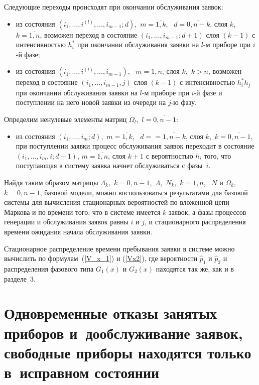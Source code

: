 \begin{multicols}{2}
Следующие переходы происходят при окончании обслуживания заявок:
\begin{itemize}
\item
из состояния
$(i_1,\ldots,i^{(l)},\ldots,i_{m-1};d)$,\
$m=\overline{1,k}$, \  $d=\overline{0,n-k}$,
слоя $k$,\ $k=\overline{1,n}$, возможен переход в состояние
$(i_1,\ldots,i_{m-1};d+1)$
слоя $(k-1)$ с интенсивностью $h^*_i $ при окончании обслуживания
заявки на $l$-м приборе при $i$-й фазе;
\item
из состояния
$(i_1,\ldots,i^{(l)},\ldots,i_{m-1})$, \ $m=\overline{1,n}$,
слоя $k$,\ $k>n$, возможен переход в состояние
$(i_1,\ldots,i_{m-1},j)$
слоя $(k-1)$ с интенсивностью $h^*_i h_j$ при окончании обслуживания
заявки на $l$-м приборе при $i$-й фазе и поступлении на него
новой заявки из очереди на $j$-ю фазу.
\end{itemize}

Определим ненулевые элементы матриц
$\Omega_l$,\  $l=\overline{0,n-1}$:
\begin{itemize}
\item
из состояния
$(i_1,\ldots,i_{m};d)$,\  $m=\overline{1,k}$,  \ $d=$\linebreak $=\overline{1,n-k}$,
слоя $k$,\ $k=\overline{0,n-1}$,  при поступлении заявки
процесс обслуживания заявок переходит в состояние
$(i_1,\ldots,i_{m},i;d-1)$, $m=\overline{1,n}$, слоя $k+1$
с вероятностью $h_i$ того, что поступающая в систему заявка
начнет обслуживаться с фазы~$i$.
\end{itemize}

Найдя таким образом матрицы
$\Lambda_k$,\  $k=\overline{0,n-1}$,\  $\Lambda$,\
$N_k$,\  $k=\overline{1,n}$, \ $N$ и
$\Omega_k$,\  $k=\overline{0,n-1}$, базовой модели, можно
воспользоваться результатами для базовой системы для вычисления
стационарных вероятностей по вложенной цепи Маркова
и по времени того, что в системе имеется $k$ заявок, а фазы
процессов генерации и обслуживания заявок равны $i$ и $j$, и
стационарного распределения времени ожидания начала
обслуживания заявки.

Стационарное распределение времени пребывания заявки в системе
можно вычислить по формулам~(\ref{V_x_1}) и (\ref{Vx2}), где
вероятности $\hat p_1$ и $\hat p_2$ и распределения фазового
типа $G_1(x)$ и $G_2(x)$ находятся так же, как и в разделе~3.

\section{Одновременные отказы занятых приборов и~дообслуживание
заявок, свободные приборы находятся только в~исправном состоянии}         %


\end{multicols}
